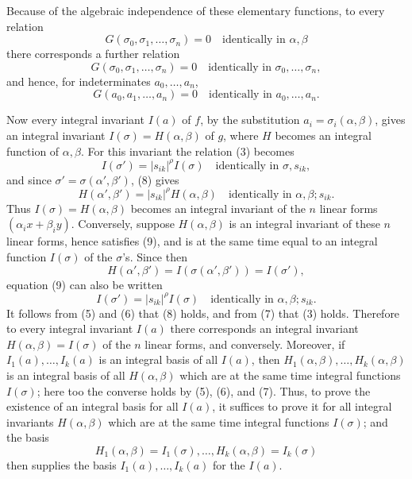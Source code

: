 \documentclass[11pt]{article}
\begin{document}
Because of the algebraic independence of these elementary functions, to every relation
\begin{equation}
        G(\sigma_0,\sigma_1,\ldots,\sigma_n)=0
        \quad \text{identically in \(\alpha,\beta\)}
\end{equation}
there corresponds a further relation
\begin{equation}
        G(\sigma_0,\sigma_1,\ldots,\sigma_n)=0
        \quad \text{identically in \(\sigma_0,\ldots,\sigma_n\)},
\end{equation}
and hence, for indeterminates \(a_0,\ldots,a_n\),
\begin{equation}
        G(a_0,a_1,\ldots,a_n)=0
        \quad \text{identically in \(a_0,\ldots,a_n\)}.
\end{equation}

Now every integral invariant \(I(a)\) of \(f\), by the substitution \(a_i=\sigma_i(\alpha,\beta)\), gives an integral invariant \(I(\sigma)=H(\alpha,\beta)\) of \(g\), where \(H\) becomes an integral function of \(\alpha,\beta\). For this invariant the relation (3) becomes
\begin{equation}
        I(\sigma')=|s_{ik}|^\rho I(\sigma)
        \quad \text{identically in \(\sigma,s_{ik}\)},
\end{equation}
and since \(\sigma'=\sigma(\alpha',\beta')\), (8) gives
\begin{equation}
        H(\alpha',\beta')=|s_{ik}|^\rho H(\alpha,\beta)
        \quad \text{identically in \(\alpha,\beta;s_{ik}\)}.
\end{equation}
Thus \(I(\sigma)=H(\alpha,\beta)\) becomes an integral invariant of the \(n\) linear forms \((\alpha_i x+\beta_i y)\). Conversely, suppose \(H(\alpha,\beta)\) is an integral invariant of these \(n\) linear forms, hence satisfies (9), and is at the same time equal to an integral function \(I(\sigma)\) of the \(\sigma\)'s. Since then
\[
        H(\alpha',\beta')=I(\sigma(\alpha',\beta'))=I(\sigma'),
\]
equation (9) can also be written
\begin{equation*}
        I(\sigma')=|s_{ik}|^\rho I(\sigma)
        \quad \text{identically in \(\alpha,\beta;s_{ik}\)}.\tag{9a}
\end{equation*}
It follows from (5) and (6) that (8) holds, and from (7) that (3) holds. Therefore to every integral invariant \(I(a)\) there corresponds an integral invariant \(H(\alpha,\beta)=I(\sigma)\) of the \(n\) linear forms, and conversely. Moreover, if \(I_1(a),\ldots,I_k(a)\) is an integral basis of all \(I(a)\), then \(H_1(\alpha,\beta),\ldots,H_k(\alpha,\beta)\) is an integral basis of all \(H(\alpha,\beta)\) which are at the same time integral functions \(I(\sigma)\); here too the converse holds by (5), (6), and (7). Thus, to prove the existence of an integral basis for all \(I(a)\), it suffices to prove it for all integral invariants \(H(\alpha,\beta)\) which are at the same time integral functions \(I(\sigma)\); and the basis
\[
        H_1(\alpha,\beta)=I_1(\sigma),\ldots,H_k(\alpha,\beta)=I_k(\sigma)
\]
then supplies the basis \(I_1(a),\ldots,I_k(a)\) for the \(I(a)\).
\end{document}
